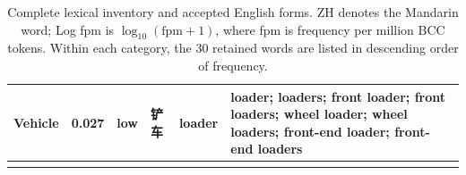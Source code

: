 {\begin{longtable}[c]{@{}>{\raggedright\arraybackslash}p{1.85cm}l l l>{\raggedright\arraybackslash}p{1.85cm}>{\raggedright\arraybackslash}p{8.10cm}@{}}
Vehicle & 0.027 & low & 铲车 & loader & loader; loaders; front loader; front loaders; wheel loader; wheel loaders; front-end loader; front-end loaders \\
\hline
\caption{Complete lexical inventory and accepted English forms. ZH denotes the Mandarin word; Log fpm is $\log_{10}(\mathrm{fpm}+1)$, where fpm is frequency per million BCC tokens. Within each category, the 30 retained words are listed in descending order of frequency.}
\label{tab:complete-lexical-inventory}\\
\end{longtable}
}

